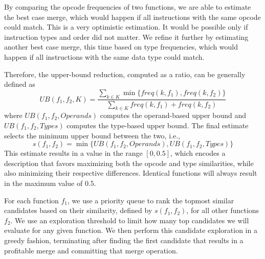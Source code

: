 By comparing the opcode frequencies of two functions, we are able to estimate
the best case merge, which would happen if all instructions with the same opcode could match.
This is a very optimistic estimation. It would be possible only if instruction types and order
did not matter. We refine it further by estimating another best case merge, this time based
on type frequencies, which would happen if all instructions with the same data type could match.


Therefore, the upper-bound reduction, computed as a ratio, can be generally defined as
\[
   U\!B(f_1,f_2, K) = \frac{\sum\limits_{k \in K} \min\{freq(k,f_1),freq(k,f_2)\}}{\sum\limits_{k \in K} freq(k,f_1)+freq(k,f_2)}
\]
where $U\!B(f_1,f_2, Operands)$ computes the operand-based upper bound and
$U\!B(f_1,f_2, Types)$ computes the type-based upper bound.
The final estimate selects the minimum upper bound between the two, i.e.,
\[
     s(f_1,f_2) = \min\{U\!B(f_1,f_2, Operands), U\!B(f_1,f_2, Types)\}
\]
This estimate results in a value in the range $[0,0.5]$,
which encodes a description that favors maximizing both the opcode and type
similarities, while also minimizing their respective differences.
Identical functions will always result in the maximum value of $0.5$.

For each function $f_1$, we use a priority queue to rank the topmost
similar candidates based on their similarity, defined by $s(f_1,f_2)$, for all
other functions $f_2$.
We use an exploration threshold to limit how many top candidates we will
evaluate for any given function.
We then perform this candidate exploration in a greedy fashion, terminating after
finding the first candidate that results in a profitable merge and committing that
merge operation.

